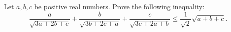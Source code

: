 Let $a,b,c$ be positive real numbers. Prove the following inequality:
$$\frac{a}{\sqrt{3a+2b+c}}+\frac{b}{\sqrt{3b+2c+a}}+
\frac{c}{\sqrt{3c+2a+b}} \leq \frac{1}{\sqrt{2}}\sqrt{a+b+c}.$$